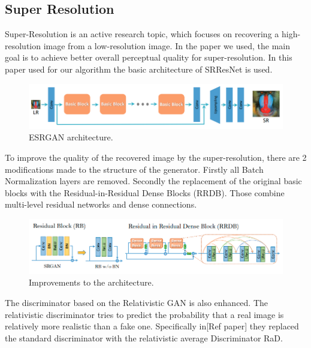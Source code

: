 \subsection*{Super Resolution}

Super-Resolution is an active research topic, which focuses on recovering a high-resolution image from a low-resolution image. In the paper we used, the main goal is to achieve better overall perceptual quality for super-resolution. In this paper used for our algorithm the basic architecture of SRResNet is used. \cite{wang2018esrgan}

\begin{figure}[ht]
    \begin{center}
        \includegraphics*[scale=.4, pagebox=artbox]{resources/Background_SR_1.png}
        \caption{ESRGAN architecture. \cite{wang2018esrgan}} \label{ESRGAN_arch}
    \end{center}
\end{figure}

To improve the quality of the recovered image by the super-resolution, there are 2 modifications made to the structure of the generator. Firstly all Batch Normalization layers are removed. Secondly the replacement of the original basic blocks with the Residual-in-Residual Dense Blocks (RRDB). Those combine multi-level residual networks and dense connections.

\begin{figure}[ht]
    \begin{center}
        \includegraphics*[scale=.4, pagebox=artbox]{resources/Background_SR_2.png}
        \caption{Improvements to the architecture. \cite{wang2018esrgan}} \label{rESRGAN_nw}
    \end{center}
\end{figure}

The discriminator based on the Relativistic GAN is also enhanced. The relativistic discriminator tries to predict the probability that a real image is relatively more realistic than a fake one. Specifically in[Ref paper] they replaced the standard discriminator with the relativistic average Discriminator RaD.

